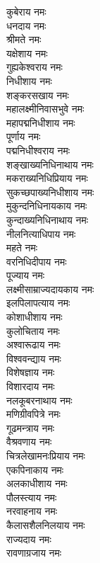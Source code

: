 \begin{multicols}{2}
\begin{flushleft}
कुबेराय नमः\\
धनदाय नमः\\
श्रीमते नमः\\
यक्षेशाय नमः\\
गुह्यकेश्वराय नमः\\
निधीशाय नमः\\
शङ्करसखाय नमः\\
महालक्ष्मीनिवासभुवे नमः\\
महापद्मनिधीशाय नमः\\
पूर्णाय नमः\hfill{}\\ %
पद्मनिधीश्वराय नमः\\
शङ्खाख्यनिधिनाथाय नमः\\
मकराख्यनिधिप्रियाय नमः\\
सुकच्छपाख्यनिधीशाय नमः\\
मुकुन्दनिधिनायकाय नमः\\
कुन्दाख्यनिधिनाथाय नमः\\
नीलनित्याधिपाय नमः\\
महते नमः\\
वरनिधिदीपाय नमः\\
पूज्याय नमः\hfill{}\\ %
लक्ष्मीसाम्राज्यदायकाय नमः\\
इलपिलापत्याय नमः\\
कोशाधीशाय नमः\\
कुलोचिताय नमः\\
अश्वारूढाय नमः\\
विश्ववन्द्याय नमः\\
विशेषज्ञाय नमः\\
विशारदाय नमः\\
नलकूबरनाथाय नमः\\
मणिग्रीवपित्रे नमः\hfill{}\\ %
गूढमन्त्राय नमः\\
वैश्रवणाय नमः\\
चित्रलेखामनःप्रियाय नमः\\
एकपिनाकाय नमः\\
अलकाधीशाय नमः\\
पौलस्त्याय नमः\\
नरवाहनाय नमः\\
कैलासशैलनिलयाय नमः\\
राज्यदाय नमः\\
रावणाग्रजाय नमः\hfill{}\\ %

\end{flushleft}
\end{multicols}
